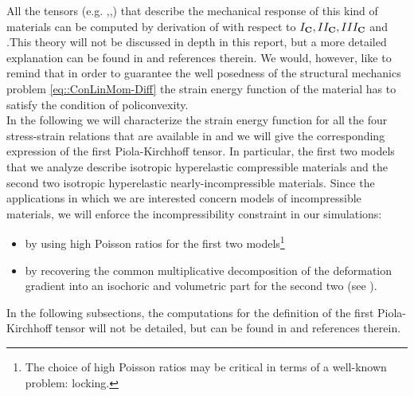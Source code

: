 All the tensors (e.g. \F,\T,\Piola) that describe the
mechanical response of this kind of materials can be computed by
derivation of \W with respect to $I_{\textbf{C}},II_{\textbf{C}},III_{\textbf{C}}$ and \C.This
theory will not be discussed in depth in this report, but a more
detailed explanation can be found in \cite{GM,Deluca} and references
therein. We would, however, like to remind that in order to guarantee
the well posedness of the structural mechanics problem
\eqref{eq::ConLinMom-Diff} the strain energy function \W of the
material has to satisfy the condition of policonvexity.\\ In the
following we will characterize the strain energy function for all the
four stress-strain relations that are available in \LV and we will
give the corresponding expression of the first Piola-Kirchhoff
tensor. In particular, the first two models that we analyze describe
isotropic hyperelastic compressible materials and the second two
isotropic hyperelastic nearly-incompressible materials. Since the
applications in which we are interested concern models of incompressible
materials, we will enforce the incompressibility constraint in our
simulations:
\begin{itemize}
\item by using high Poisson ratios for the first two
  models\footnote{The choice of high Poisson ratios may be critical in
    terms of a well-known problem: locking.}
\item by recovering the common multiplicative decomposition of the
  deformation gradient \F into an isochoric and volumetric part for the
  second two (see \cite{BonetWood}).
\end{itemize} In the following subsections, the computations for the
definition of the first Piola-Kirchhoff tensor will not be detailed,
but can be found in \cite{Deluca} and references therein.

